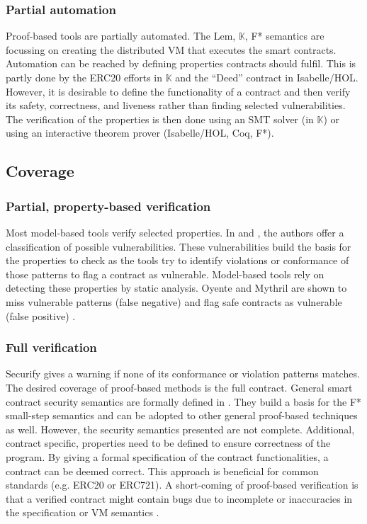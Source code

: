 \subsubsection{Partial automation}
Proof-based tools are partially automated. The Lem, $\mathbb{K}$, F* semantics are focussing on creating the distributed VM that executes the smart contracts. Automation can be reached by defining properties contracts should fulfil. This is partly done by the ERC20 efforts in $\mathbb{K}$ and the ``Deed'' contract in Isabelle/HOL. However, it is desirable to define the functionality of a contract and then verify its safety, correctness, and liveness rather than finding selected vulnerabilities. The verification of the properties is then done using an SMT solver (in $\mathbb{K}$) or using an interactive theorem prover (Isabelle/HOL, Coq, F*).

\subsection{Coverage} 
\subsubsection{Partial, property-based verification}
Most model-based tools verify selected properties. In \cite{Atzei2017} and \cite{Luu2016}, the authors offer a classification of possible vulnerabilities. These vulnerabilities build the basis for the properties to check as the tools try to identify violations or conformance of those patterns to flag a contract as vulnerable.
Model-based tools rely on detecting these properties by static analysis. 
Oyente and Mythril are shown to miss vulnerable patterns (false negative) and flag safe contracts as vulnerable (false positive) \cite{Tsankov2017}.

\subsubsection{Full verification}
Securify gives a warning if none of its conformance or violation patterns matches.
The desired coverage of proof-based methods is the full contract. 
General smart contract security semantics are formally defined in \cite{Grishchenko2018}. They build a basis for the F* small-step semantics and can be adopted to other general proof-based techniques as well.
However, the security semantics presented are not complete.
Additional, contract specific, properties need to be defined to ensure correctness of the program.
By giving a formal specification of the contract functionalities, a contract can be deemed correct. This approach is beneficial for common standards (e.g. ERC20 or ERC721). A short-coming of proof-based verification is that a verified contract might contain bugs due to incomplete or inaccuracies in the specification or VM semantics \cite{Hirai2016}.

